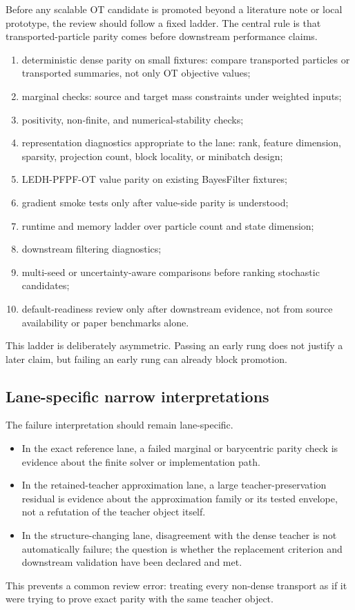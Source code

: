 Before any scalable OT candidate is promoted beyond a literature note or local
prototype, the review should follow a fixed ladder.  The central rule is that
transported-particle parity comes before downstream performance claims.
\begin{enumerate}[label=(\arabic*)]
  \item deterministic dense parity on small fixtures: compare transported
    particles or transported summaries, not only OT objective values;
  \item marginal checks: source and target mass constraints under weighted inputs;
  \item positivity, non-finite, and numerical-stability checks;
  \item representation diagnostics appropriate to the lane: rank, feature
    dimension, sparsity, projection count, block locality, or minibatch design;
  \item LEDH-PFPF-OT value parity on existing BayesFilter fixtures;
  \item gradient smoke tests only after value-side parity is understood;
  \item runtime and memory ladder over particle count and state dimension;
  \item downstream filtering diagnostics;
  \item multi-seed or uncertainty-aware comparisons before ranking stochastic
    candidates;
  \item default-readiness review only after downstream evidence, not from source
    availability or paper benchmarks alone.
\end{enumerate}
This ladder is deliberately asymmetric.  Passing an early rung does not justify a
later claim, but failing an early rung can already block promotion.

\subsection{Lane-specific narrow interpretations}
\label{sec:bf-dpf-debug-lane-interpretation}

The failure interpretation should remain lane-specific.
\begin{itemize}
  \item In the exact reference lane, a failed marginal or barycentric parity check
    is evidence about the finite solver or implementation path.
  \item In the retained-teacher approximation lane, a large teacher-preservation
    residual is evidence about the approximation family or its tested envelope,
    not a refutation of the teacher object itself.
  \item In the structure-changing lane, disagreement with the dense teacher is not
    automatically failure; the question is whether the replacement criterion and
    downstream validation have been declared and met.
\end{itemize}
This prevents a common review error: treating every non-dense transport as if it
were trying to prove exact parity with the same teacher object.

